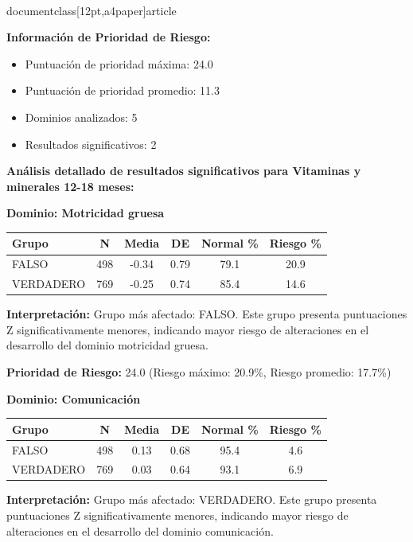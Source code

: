 \\documentclass[12pt,a4paper]{article}
\begin{document}
\textbf{Información de Prioridad de Riesgo:}
\begin{itemize}
\item Puntuación de prioridad máxima: 24.0
\item Puntuación de prioridad promedio: 11.3
\item Dominios analizados: 5
\item Resultados significativos: 2
\end{itemize}


\textbf{Análisis detallado de resultados significativos para Vitaminas y minerales 12-18 meses:}


\textbf{Dominio: Motricidad gruesa}


\begin{center}
\begin{tabular}{|l|c|c|c|c|c|}
\hline
\textbf{Grupo} & \textbf{N} & \textbf{Media} & \textbf{DE} & \textbf{Normal \%} & \textbf{Riesgo \%} \\
\hline
FALSO & 498 & -0.34 & 0.79 & 79.1 & 20.9 \\
VERDADERO & 769 & -0.25 & 0.74 & 85.4 & 14.6 \\

\hline
\end{tabular}
\end{center}


\textbf{Interpretación:} Grupo más afectado: FALSO. Este grupo presenta puntuaciones Z significativamente menores, indicando mayor riesgo de alteraciones en el desarrollo del dominio motricidad gruesa.

\textbf{Prioridad de Riesgo:} 24.0 (Riesgo máximo: 20.9\%, Riesgo promedio: 17.7\%)


\vspace{0.5cm}


\textbf{Dominio: Comunicación}


\begin{center}
\begin{tabular}{|l|c|c|c|c|c|}
\hline
\textbf{Grupo} & \textbf{N} & \textbf{Media} & \textbf{DE} & \textbf{Normal \%} & \textbf{Riesgo \%} \\
\hline
FALSO & 498 & 0.13 & 0.68 & 95.4 & 4.6 \\
VERDADERO & 769 & 0.03 & 0.64 & 93.1 & 6.9 \\

\hline
\end{tabular}
\end{center}


\textbf{Interpretación:} Grupo más afectado: VERDADERO. Este grupo presenta puntuaciones Z significativamente menores, indicando mayor riesgo de alteraciones en el desarrollo del dominio comunicación.
\end{document}
